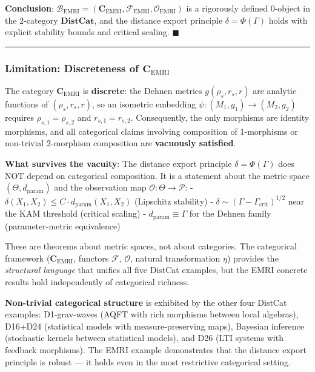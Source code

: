 \documentclass[
]{article}
\begin{document}
\textbf{Conclusion}:
\(\mathcal{B}_{\text{EMRI}} = (\mathbf{C}_{\text{EMRI}}, \mathcal{F}_{\text{EMRI}}, \mathcal{O}_{\text{EMRI}})\)
is a rigorously defined 0-object in the 2-category \(\mathbf{DistCat}\),
and the distance export principle \(\delta = \Phi(\Gamma)\) holds with
explicit stability bounds and critical scaling. \(\blacksquare\)

\begin{center}\rule{0.5\linewidth}{0.5pt}\end{center}

\subsubsection{\texorpdfstring{Limitation: Discreteness of
\(\mathbf{C}_{\text{EMRI}}\)}{Limitation: Discreteness of \textbackslash mathbf\{C\}\_\{\textbackslash text\{EMRI\}\}}}\label{limitation-discreteness-of-mathbfc_textemri}

The category \(\mathbf{C}_{\text{EMRI}}\) is \textbf{discrete}: the
Dehnen metrics \(g(\rho_s, r_s, r)\) are analytic functions of
\((\rho_s, r_s, r)\), so an isometric embedding
\(\psi: (M_1, g_1) \to (M_2, g_2)\) requires \(\rho_{s,1} = \rho_{s,2}\)
and \(r_{s,1} = r_{s,2}\). Consequently, the only morphisms are identity
morphisms, and all categorical claims involving composition of
1-morphisms or non-trivial 2-morphism composition are \textbf{vacuously
satisfied}.

\textbf{What survives the vacuity}: The distance export principle
\(\delta = \Phi(\Gamma)\) does NOT depend on categorical composition. It
is a statement about the metric space \((\Theta, d_{\text{param}})\) and
the observation map \(\mathcal{O}: \Theta \to \mathcal{P}\): -
\(\delta(X_1, X_2) \leq C \cdot d_{\text{param}}(X_1, X_2)\) (Lipschitz
stability) - \(\delta \sim (\Gamma - \Gamma_{\text{crit}})^{1/2}\) near
the KAM threshold (critical scaling) -
\(d_{\text{param}} \equiv \Gamma\) for the Dehnen family
(parameter-metric equivalence)

These are theorems about metric spaces, not about categories. The
categorical framework (\(\mathbf{C}_{\text{EMRI}}\), functors
\(\mathcal{F}\), \(\mathcal{O}\), natural transformation \(\eta\))
provides the \emph{structural language} that unifies all five DistCat
examples, but the EMRI concrete results hold independently of
categorical richness.

\textbf{Non-trivial categorical structure} is exhibited by the other
four DistCat examples: D1-grav-waves (AQFT with rich morphisms between
local algebras), D16+D24 (statistical models with measure-preserving
maps), Bayesian inference (stochastic kernels between statistical
models), and D26 (LTI systems with feedback morphisms). The EMRI example
demonstrates that the distance export principle is robust --- it holds
even in the most restrictive categorical setting.
\end{document}
